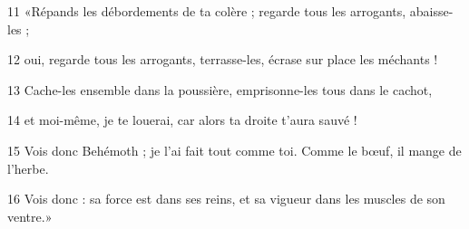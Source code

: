 11 «Répands les débordements de ta colère ; regarde tous les arrogants, abaisse-les ;

12 oui, regarde tous les arrogants, terrasse-les, écrase sur place les méchants !

13 Cache-les ensemble dans la poussière, emprisonne-les tous dans le cachot,

14 et moi-même, je te louerai, car alors ta droite t’aura sauvé !

15 Vois donc Behémoth ; je l’ai fait tout comme toi. Comme le bœuf, il mange de l’herbe.

16 Vois donc : sa force est dans ses reins, et sa vigueur dans les muscles de son ventre.»